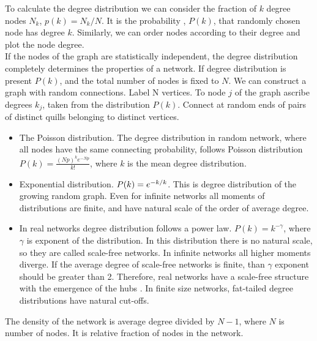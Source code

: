 To calculate the degree distribution we can consider the fraction of $k$ degree nodes $N_k$, $p(k) = N_k/N$. It is the probability , $P(k)$, that randomly chosen node has degree $k$. Similarly, we can order nodes according to their degree and plot the node degree. \\

If the nodes of the graph are statistically independent, the degree distribution completely determines the properties of a network. If degree distribution is present $P(k)$, and the total number of nodes is fixed to $N$. We can construct a graph with random connections. Label N vertices. To node $j$ of the graph ascribe degrees $k_j$, taken from the distribution $P(k)$. Connect at random ends of pairs of distinct quills belonging to distinct vertices. 

\begin{itemize}
	\item The Poisson distribution. The degree distribution in random network, where all nodes have the same connecting probability, follows Poisson distribution $P(k)= \frac{(Np)^ke^{-Np}}{k!}$, where $k$ is the mean degree distribution. 
	
	\item Exponential distribution. $P(k) = e^{-k/ \- k}$. This is degree distribution of the growing random graph. Even for infinite networks all moments of distributions are finite, and have natural scale of the order of average degree.
	
	\item In real networks degree distribution follows a power law. $P(k) = k ^ {-\gamma} $, where $\gamma$ is exponent of the distribution. In this distribution there is no natural scale, so they are called scale-free networks. In infinite networks all higher moments diverge. If the average degree of scale-free networks is finite, than $\gamma$ exponent should be greater than 2. Therefore, real networks have a scale-free structure with the emergence of the hubs \cite{newman2010}. In finite size networks, fat-tailed degree distributions have natural cut-offs. 
\end{itemize}

 



The density of the network is average degree divided by $N-1$, where $N$ is number of nodes. It is relative fraction of nodes in the network. 

